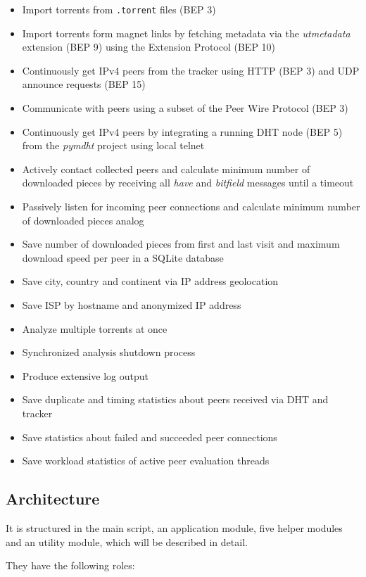 \documentclass[10pt, a4paper, twoside]{scrartcl}
\renewcommand{\_}{\origunderscore\allowbreak}
\begin{document}
\begin{itemize}
\item Import torrents from \texttt{.torrent} files (BEP 3)
\item Import torrents form magnet links by fetching metadata via the \emph{ut\_metadata} extension (BEP 9) using the Extension Protocol (BEP 10)
\item Continuously get IPv4 peers from the tracker using HTTP (BEP 3) and UDP announce requests (BEP 15)
\item Communicate with peers using a subset of the Peer Wire Protocol (BEP 3)
\item Continuously get IPv4 peers by integrating a running DHT node (BEP 5) from the \emph{pymdht} project using local telnet
\item Actively contact collected peers and calculate minimum number of downloaded pieces by receiving all \emph{have} and \emph{bitfield} messages until a timeout
\item Passively listen for incoming peer connections and calculate minimum number of downloaded pieces analog
\item Save number of downloaded pieces from first and last visit and maximum download speed per peer in a SQLite database
\item Save city, country and continent via IP address geolocation
\item Save ISP by hostname and anonymized IP address
\item Analyze multiple torrents at once
\item Synchronized analysis shutdown process
\item Produce extensive log output
\item Save duplicate and timing statistics about peers received via DHT and tracker
\item Save statistics about failed and succeeded peer connections
\item Save workload statistics of active peer evaluation threads
\end{itemize}

\subsection{Architecture}
It is structured in the main script, an application module, five helper modules and an utility module, which will be described in detail.

They have the following roles:
\end{document}

